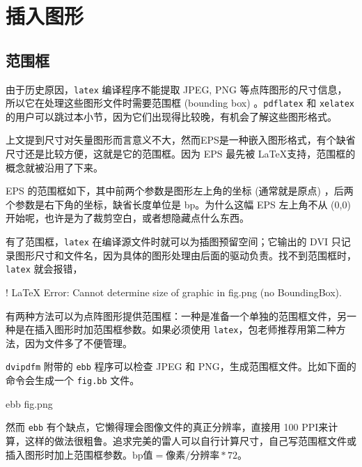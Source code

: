 \section{插入图形}
\label{sec:includegraphics}

\subsection{范围框}

由于历史原因，\texttt{latex} 编译程序不能提取 JPEG, PNG 等点阵图形的尺寸信息，所以它在处理这些图形文件时需要范围框 (bounding box) 。\texttt{pdflatex} 和 \texttt{xelatex} 的用户可以跳过本小节，因为它们出现得比较晚，有机会了解这些图形格式。

上文提到尺寸对矢量图形而言意义不大，然而EPS是一种嵌入图形格式，有个缺省尺寸还是比较方便，这就是它的范围框。因为 EPS 最先被 \LaTeX 支持，范围框的概念就被沿用了下来。

EPS 的范围框如下，其中前两个参数是图形左上角的坐标 (通常就是原点) ，后两个参数是右下角的坐标，缺省长度单位是 bp。为什么这幅 EPS 左上角不从 (0,0) 开始呢，也许是为了裁剪空白，或者想隐藏点什么东西。

\begin{Code}[]
\end{Code}

有了范围框，\texttt{latex} 在编译源文件时就可以为插图预留空间；它输出的 DVI 只记录图形尺寸和文件名，因为具体的图形处理由后面的驱动负责。找不到范围框时，\texttt{latex} 就会报错，

\begin{Code}[]
! LaTeX Error: Cannot determine size of graphic in fig.png (no BoundingBox).
\end{Code}

有两种方法可以为点阵图形提供范围框：一种是准备一个单独的范围框文件，另一种是在插入图形时加范围框参数。如果必须使用 \texttt{latex}，包老师推荐用第二种方法，因为文件多了不便管理。

\texttt{dvipdfm} 附带的 \texttt{ebb} 程序可以检查 JPEG 和 PNG，生成范围框文件。比如下面的命令会生成一个 \texttt{fig.bb} 文件。

\begin{Code}[]
ebb fig.png
\end{Code}

然而 \texttt{ebb} 有个缺点，它懒得理会图像文件的真正分辨率，直接用 100 PPI来计算，这样的做法很粗鲁。追求完美的雷人可以自行计算尺寸，自己写范围框文件或插入图形时加上范围框参数。$ \text{bp值} = \text{像素} / \text{分辨率} * 72 $。

